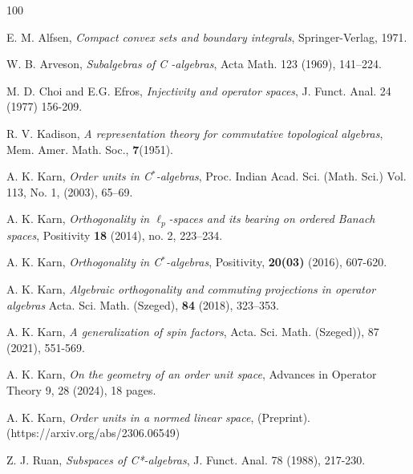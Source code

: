 \documentclass[12pt]{amsart}
\begin{document}
\begin{thebibliography}{100}

 E. M. Alfsen, \textit{Compact convex sets and boundary integrals}, Springer-Verlag, 1971.

 W. B. Arveson, \textit{Subalgebras of C -algebras}, Acta Math. 123 (1969), 141–224.

 M. D. Choi and E.G. Efros, \textit{Injectivity and operator spaces}, J. Funct. Anal. 24 (1977) 156-209.

 R. V. Kadison, \textit{A representation theory for commutative topological algebras}, Mem. Amer. Math. Soc., \textbf{7}(1951). 

 A. K. Karn, \textit{Order units in C$^*$-algebras}, Proc. Indian Acad. Sci. (Math. Sci.) Vol. 113, No. 1, (2003), 65–69. 

 A. K. Karn, \textit{Orthogonality in $\ell_p$-spaces and its bearing on ordered Banach spaces}, Positivity \textbf{18} (2014), no. 2, 223–234. 

 A. K. Karn, \textit{Orthogonality in C$^*$-algebras}, Positivity, {\bf 20(03)} (2016), 607-620. 

 A. K. Karn, \textit{Algebraic orthogonality and commuting projections in operator algebras} Acta. Sci. Math. (Szeged), \textbf{84} (2018), 323--353.

 A. K. Karn, \textit{A generalization of spin factors}, Acta. Sci. Math. (Szeged)), 87 (2021), 551-569. 

 A. K. Karn, \textit{On the geometry of an order unit space}, Advances in Operator Theory 9, 28 (2024), 18 pages. 

 A. K. Karn, \textit{Order units in a normed linear space}, (Preprint). (https://arxiv.org/abs/2306.06549)

 Z. J. Ruan, \textit{Subspaces of C*-algebras}, J. Funct. Anal. 78 (1988), 217-230.

\end{thebibliography}
\end{document}
